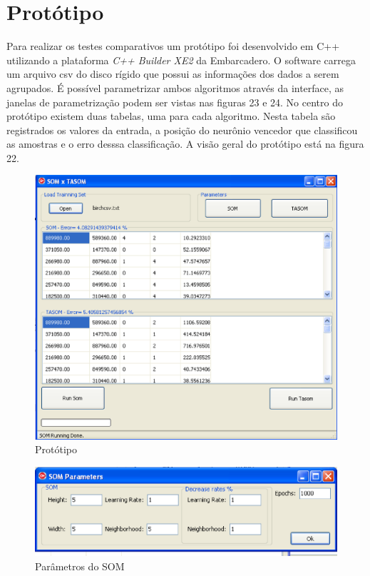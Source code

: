 \section{Protótipo}
Para realizar os testes comparativos um protótipo foi desenvolvido em C++ utilizando a plataforma \textit{C++ Builder XE2} da Embarcadero. O software carrega um arquivo csv do disco rígido que possui as informações dos dados a serem agrupados. É possível parametrizar ambos algoritmos através da interface, as janelas de parametrização podem ser vistas nas figuras 23 e 24. No centro do protótipo existem duas tabelas, uma para cada algoritmo. Nesta tabela são registrados os valores da entrada, a posição do neurônio vencedor que classificou as amostras e o erro desssa classificação. A visão geral do protótipo está na figura 22. 

\begin{figure}[!h]
\centering
\includegraphics[keepaspectratio=true,scale=0.5]
{figuras/proto.eps}
\caption{Protótipo}
\label{data_titatic}
\end{figure}

\begin{figure}[!h]
\centering
\includegraphics[keepaspectratio=true,scale=0.5]
{figuras/somparams.eps}
\caption{Parâmetros do SOM}
\label{data_titatic}
\end{figure}

